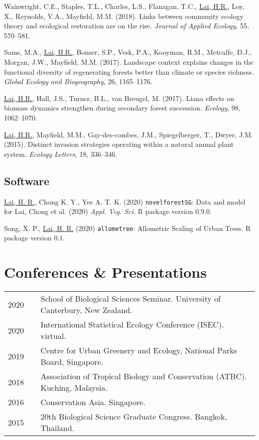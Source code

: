 \documentclass[a4paper]{article}
\begin{document}
\hangindent=1cm Wainwright, C.E., Staples, T.L., Charles, L.S., Flanagan, T.C., \underline{Lai, H.R.}, Loy, X., Reynolds, V.A., Mayfield, M.M. (2018). Links between community ecology theory and ecological restoration are on the rise. \textit{Journal of Applied Ecology}, 55, 570--581.

\hangindent=1cm Sams, M.A., \underline{Lai, H.R.}, Bonser, S.P., Vesk, P.A., Kooyman, R.M., Metcalfe, D.J., Morgan, J.W., Mayfield, M.M. (2017). Landscape context explains changes in the functional diversity of regenerating forests better than climate or species richness. \textit{Global Ecology and Biogeography}, 26, 1165--1176.

\hangindent=1cm \underline{Lai, H.R.}, Hall, J.S., Turner, B.L., van Breugel, M. (2017). Liana effects on biomass dynamics strengthen during secondary forest succession. \textit{Ecology}, 98, 1062--1070.

\hangindent=1cm \underline{Lai, H.R.}, Mayfield, M.M., Gay-des-combes, J.M., Spiegelberger, T., Dwyer, J.M. (2015). Distinct invasion strategies operating within a natural annual plant system. \textit{Ecology Letters}, 18, 336--346.

\subsection*{Software}
\hangindent=1cm \underline{Lai, H. R.}, Chong K. Y., Yee A. T. K. (2020) \texttt{novelforestSG}: Data and model for Lai, Chong et al. (2020) \textit{Appl. Veg. Sci.} R package version 0.9.0.

\hangindent=1cm Song, X. P., \underline{Lai, H. R.} (2020) \texttt{allometree}: Allometric Scaling of Urban Trees. R package version 0.1.

\section*{Conferences \& Presentations}
\begin{tabular}{p{0.13\linewidth} p{0.87\linewidth}}
2020 & School of Biological Sciences Seminar. University of Canterbury, New Zealand. \\
2020 & International Statistical Ecology Conference (ISEC). virtual. \\
2019 & Centre for Urban Greenery and Ecology, National Parks Board, Singapore. \\
2018 & Association of Tropical Biology and Conservation (ATBC). Kuching, Malaysia. \\
2016 & Conservation Asia. Singapore. \\
2015 & 20th Biological Science Graduate Congress. Bangkok, Thailand. \\
\end{tabular}
\end{document}
